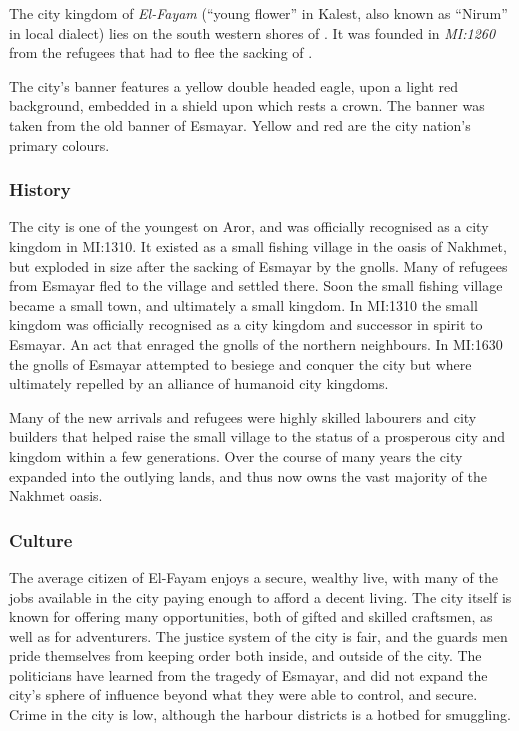 The city kingdom of \emph{El-Fayam} (``young flower'' in Kalest, also known
as ``Nirum'' in local dialect) lies on the south western shores of
. It was founded in \emph{MI:1260} from the refugees that
had to flee the sacking of .

The city's banner features a yellow double headed eagle, upon a light red
background, embedded in a shield upon which rests a crown. The banner was
taken from the old banner of Esmayar. Yellow and red are the city nation's
primary colours.

\subsubsection{History}

The city is one of the youngest on Aror, and was officially recognised as a
city kingdom in MI:1310. It existed as a small fishing village in the oasis of
Nakhmet, but exploded in size after the sacking of Esmayar by the gnolls. Many
of refugees from Esmayar fled to the village and settled there. Soon the small
fishing village became a small town, and ultimately a small kingdom. In
MI:1310 the small kingdom was officially recognised as a city kingdom and
successor in spirit to Esmayar. An act that enraged the gnolls of the northern
neighbours. In MI:1630 the gnolls of Esmayar attempted to besiege and conquer
the city but where ultimately repelled by an alliance of humanoid city
kingdoms.

Many of the new arrivals and refugees were highly skilled labourers and city
builders that helped raise the small village to the status of a prosperous
city and kingdom within a few generations. Over the course of many years the
city expanded into the outlying lands, and thus now owns the vast majority of
the Nakhmet oasis.

\subsubsection{Culture}

The average citizen of El-Fayam enjoys a secure, wealthy live, with many of
the jobs available in the city paying enough to afford a decent living. The
city itself is known for offering many opportunities, both of gifted and skilled
craftsmen, as well as for adventurers. The justice system of the city is fair,
and the guards men pride themselves from keeping order both inside, and outside
of the city. The politicians have learned from the tragedy of Esmayar, and did
not expand the city's sphere of influence beyond what they were able to control,
and secure. Crime in the city is low, although the harbour districts is a hotbed
for smuggling.

